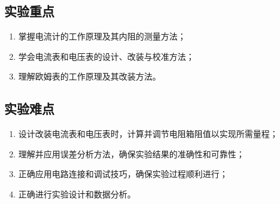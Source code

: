 \documentclass[]{../template/Report}
\begin{document}
\subsection{实验重点}
\begin{enumerate}
    \item 掌握电流计的工作原理及其内阻的测量方法；
    \item 学会电流表和电压表的设计、改装与校准方法；
    \item 理解欧姆表的工作原理及其改装方法。
\end{enumerate}
\subsection{实验难点}
\begin{enumerate}
    \item 设计改装电流表和电压表时，计算并调节电阻箱阻值以实现所需量程；
    \item 理解并应用误差分析方法，确保实验结果的准确性和可靠性；
    \item 正确应用电路连接和调试技巧，确保实验过程顺利进行；
    \item 正确进行实验设计和数据分析。
\end{enumerate}
\end{document}
